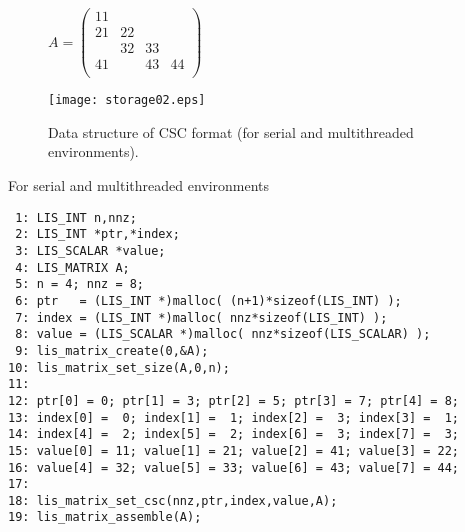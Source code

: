 \documentclass[a4paper]{article}
\begin{document}
\begin{figure}[h]
{\centering 
\begin{minipage}{0.3\textwidth}
\begin{flushright}
$ 
A = \left(
\begin{array}{cccc}
11 &    &    &    \\
21 & 22 &    &    \\
   & 32 & 33 &    \\
41 &    & 43 & 44 \\
\end{array}\right)
$
\end{flushright}
\end{minipage}
\begin{minipage}{0.6\textwidth}
\begin{flushleft}
\texttt{[image: storage02.eps]} 
\end{flushleft}
\end{minipage}
\caption{Data structure of CSC format (for serial and multithreaded environments).}\label{fig:storage02}}
\end{figure}
\begin{itemsquarebox}[l]{For serial and multithreaded environments}
\small
\begin{verbatim}
 1: LIS_INT n,nnz;
 2: LIS_INT *ptr,*index;
 3: LIS_SCALAR *value;
 4: LIS_MATRIX A;
 5: n = 4; nnz = 8;
 6: ptr   = (LIS_INT *)malloc( (n+1)*sizeof(LIS_INT) );
 7: index = (LIS_INT *)malloc( nnz*sizeof(LIS_INT) );
 8: value = (LIS_SCALAR *)malloc( nnz*sizeof(LIS_SCALAR) );
 9: lis_matrix_create(0,&A);
10: lis_matrix_set_size(A,0,n);
11:
12: ptr[0] = 0; ptr[1] = 3; ptr[2] = 5; ptr[3] = 7; ptr[4] = 8;
13: index[0] =  0; index[1] =  1; index[2] =  3; index[3] =  1;
14: index[4] =  2; index[5] =  2; index[6] =  3; index[7] =  3;
15: value[0] = 11; value[1] = 21; value[2] = 41; value[3] = 22;
16: value[4] = 32; value[5] = 33; value[6] = 43; value[7] = 44;
17:
18: lis_matrix_set_csc(nnz,ptr,index,value,A);
19: lis_matrix_assemble(A);
\end{verbatim}
\end{itemsquarebox}

\newpage
\end{document}
